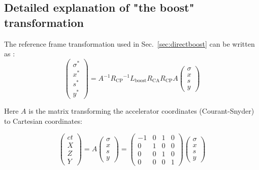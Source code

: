 \begin{appendices}
\renewcommand{\thesubsection}{A\arabic{subsection}}



\subsection{Detailed explanation of "the boost" transformation}
\label{app:boost}
The reference frame transformation used in Sec.~\ref{sec:directboost} can be written as \cite{hirata, beam_beam}:
\begin{equation}
\left( \begin{matrix}
\sigma^*\\
x^*\\
s^*\\
y^*
\end{matrix} \right) = A^{-1}{R_{\mathrm{CP}}}^{-1}L_{\mathrm{boost}}R_{\mathrm{CA}}R_{\mathrm{CP}}A
\left( \begin{matrix}
\sigma\\
x\\
s\\
y
\end{matrix} \right) 
\end{equation}

Here $A$ is the matrix transforming the accelerator coordinates (Courant-Snyder) to Cartesian coordinates:

\begin{equation}
\left( \begin{matrix}
ct\\
X\\
Z\\
Y
\end{matrix} \right) = A
\left( \begin{matrix}
\sigma\\
x\\
s\\
y
\end{matrix} \right) =
\left( \begin{matrix}
-1 &0 &1&0\\
0 &1 &0&0\\
0 &0 &1&0\\
0 &0 &0&1
\end{matrix} \right) 
\left( \begin{matrix}
\sigma\\
x\\
s\\
y
\end{matrix} \right)
\end{equation}


\end{appendices}
